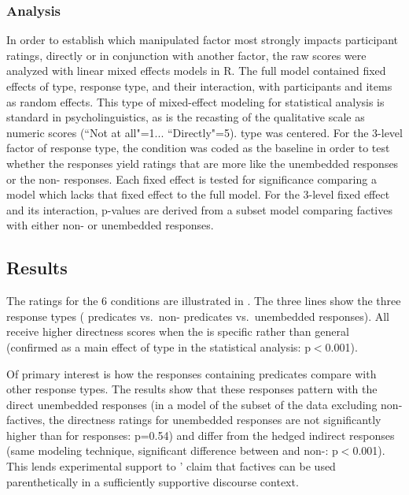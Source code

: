 \documentclass[output=paper]{langsci/langscibook}
\begin{document}
\subsubsection{Analysis}

In order to establish which manipulated factor most strongly impacts
participant ratings, directly or in conjunction with another factor, the raw
scores were analyzed with linear mixed effects models in R. The full model
contained fixed effects of  type, response type, and their interaction,
with participants and items as random effects. This type of mixed-effect
modeling for statistical analysis is standard in psycholinguistics, as is the
recasting of the qualitative scale as numeric scores (``Not at all"=1...
``Directly"=5).  type was centered. For the 3-level factor of response
type, the  condition was coded as the baseline in order to test whether
the  responses yield ratings that are more like the unembedded responses
or the non- responses.  Each fixed effect is tested for significance
comparing a model which lacks that fixed effect to the full model.  For the
3-level fixed effect and its interaction, p-values are derived from a subset
model comparing factives with either non- or unembedded responses.

\subsection{Results}
\label{sec:exp1}

The ratings for the 6 conditions are illustrated in .  The three lines show the three response types ( predicates vs.\ non- predicates vs.\ unembedded responses).  All receive higher directness scores when the  is specific rather than general (confirmed as a main effect of  type in the statistical analysis: p$<$0.001).

Of primary interest is how the responses containing  predicates compare with other response types. The results show that these responses pattern with the direct unembedded responses (in a model of the subset of the data excluding non-factives, the directness ratings for unembedded responses are not significantly higher than for  responses: p=0.54) and differ from the hedged indirect responses (same modeling technique, significant difference between  and non-: p$<$0.001).  This lends experimental support to \citeauthor{Simons2007}' claim that factives can be used parenthetically in a sufficiently supportive discourse context.
\end{document}
